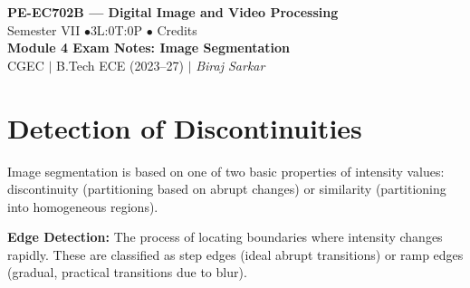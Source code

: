 \documentclass[12pt,a4paper]{article}
\begin{document}

\begin{center}
  {\LARGE\bfseries\color{myred} PE-EC702B --- Digital Image and Video Processing}\\[5pt]
  {\normalsize\color{mydark} Semester VII \quad$\bullet$\quad 3L:0T:0P \quad$\bullet$ Credits}\\[3pt]
  {\normalsize\color{myteal}\textbf{Module 4 Exam Notes: Image Segmentation}}\\[3pt]
  {\small\color{mydark} CGEC \;$|$\; B.Tech ECE (2023--27) \;$|$\; \textit{Biraj Sarkar}}
\end{center}
\vspace{2pt}
\noindent{\color{myred}\rule{\linewidth}{1.5pt}}
\vspace{2pt}

\hypersetup{linkcolor=mydark}
\tableofcontents
\hypersetup{linkcolor=myteal}
\newpage

\section{Detection of Discontinuities}

Image segmentation is based on one of two basic properties of intensity values: discontinuity (partitioning based on abrupt changes) or similarity (partitioning into homogeneous regions).

\begin{tcolorbox}[defbox, title={Edge and Line Detection}]
\textbf{Edge Detection:} The process of locating boundaries where intensity changes rapidly. These are classified as step edges (ideal abrupt transitions) or ramp edges (gradual, practical transitions due to blur).
\end{tcolorbox}
\end{document}
